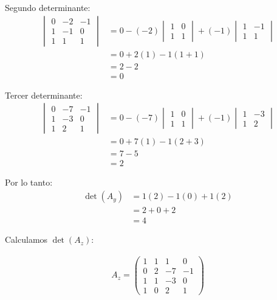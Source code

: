 \documentclass{article}
\begin{document}
Segundo determinante:
\begin{align}
    \begin{vmatrix} 0 & -2 & -1 \\ 1 & -1 & 0 \\ 1 & 1 & 1 \end{vmatrix} &= 0 - (-2) \begin{vmatrix} 1 & 0 \\ 1 & 1 \end{vmatrix} + (-1) \begin{vmatrix} 1 & -1 \\ 1 & 1 \end{vmatrix} \\
    &= 0 + 2(1) - 1(1 + 1) \\
    &= 2 - 2 \\
    &= 0
\end{align}

Tercer determinante:
\begin{align}
    \begin{vmatrix} 0 & -7 & -1 \\ 1 & -3 & 0 \\ 1 & 2 & 1 \end{vmatrix} &= 0 - (-7) \begin{vmatrix} 1 & 0 \\ 1 & 1 \end{vmatrix} + (-1) \begin{vmatrix} 1 & -3 \\ 1 & 2 \end{vmatrix} \\
    &= 0 + 7(1) - 1(2 + 3) \\
    &= 7 - 5 \\
    &= 2
\end{align}

Por lo tanto:
\begin{align}
    \det(A_y) &= 1(2) - 1(0) + 1(2) \\
    &= 2 + 0 + 2 \\
    &= 4
\end{align}

Calculamos $\det(A_z)$:

\begin{align}
    A_z = \begin{pmatrix}
    1 & 1 & 1 & 0 \\
    0 & 2 & -7 & -1 \\
    1 & 1 & -3 & 0 \\
    1 & 0 & 2 & 1
    \end{pmatrix}
\end{align}
\end{document}
